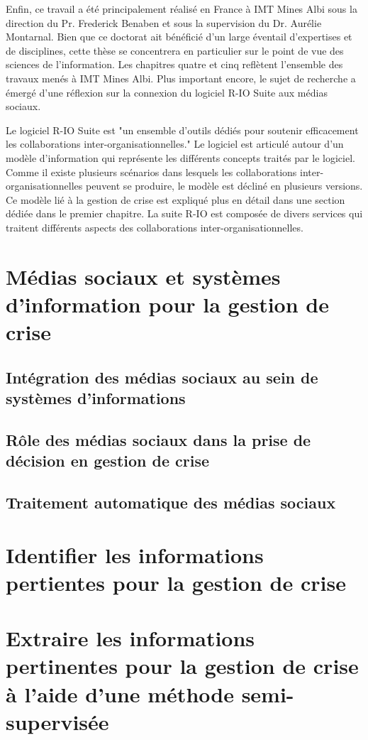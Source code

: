 Enfin, ce travail a été principalement réalisé en France à IMT Mines Albi sous la direction du Pr. Frederick Benaben et sous la supervision du Dr. Aurélie Montarnal. Bien que ce doctorat ait bénéficié d'un large éventail d'expertises et de disciplines, cette thèse se concentrera en particulier sur le point de vue des sciences de l'information. Les chapitres quatre et cinq reflètent l'ensemble des travaux menés à IMT Mines Albi. Plus important encore, le sujet de recherche a émergé d'une réflexion sur la connexion du logiciel R-IO Suite aux médias sociaux.

Le logiciel R-IO Suite  est "un ensemble d'outils dédiés pour soutenir efficacement les collaborations inter-organisationnelles." Le logiciel est articulé autour d'un modèle d'information qui représente les différents concepts traités par le logiciel. Comme il existe plusieurs scénarios dans lesquels les collaborations inter-organisationnelles peuvent se produire, le modèle est décliné en plusieurs versions. Ce modèle lié à la gestion de crise est expliqué plus en détail dans une section dédiée dans le premier chapitre. La suite R-IO est composée de divers services qui traitent différents aspects des collaborations inter-organisationnelles.

\section*{Médias sociaux et systèmes d'information pour la gestion de crise}

\subsection*{Intégration des médias sociaux au sein de systèmes d'informations}

\subsection*{Rôle des médias sociaux dans la prise de décision en gestion de crise}

\subsection*{Traitement automatique des médias sociaux}

\section*{Identifier les informations pertientes pour la gestion de crise}

\section*{Extraire les informations pertinentes pour la gestion de crise à l'aide d'une méthode semi-supervisée}
